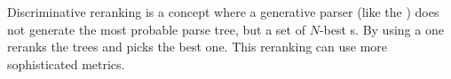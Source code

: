 \begin{df}{Discriminative reranking}
\sb{} is a concept where a generative parser (like the ) does not generate the most probable parse tree, but a set of $N$-best s. By using a  one reranks the trees and picks the best one. This reranking can use more sophisticated metrics.
\end{df}
